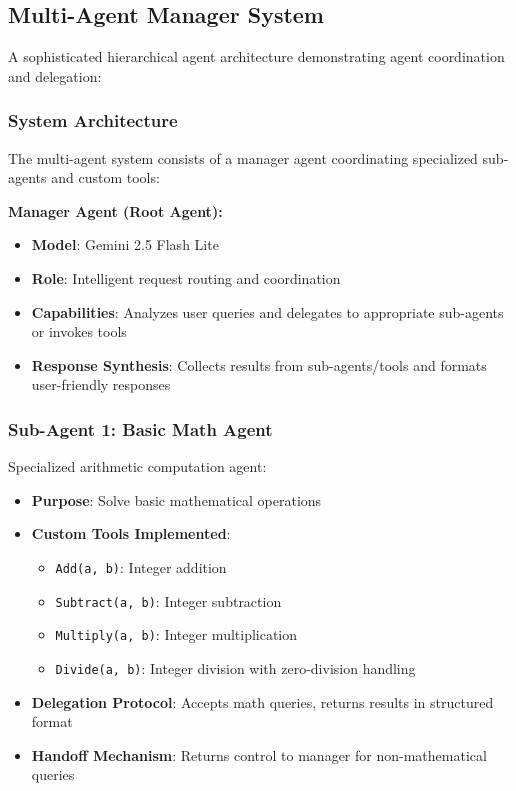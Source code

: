 \documentclass[12pt,a4paper]{article}
\begin{document}
\subsection{Multi-Agent Manager System}

A sophisticated hierarchical agent architecture demonstrating agent coordination and delegation:

\subsubsection{System Architecture}

The multi-agent system consists of a manager agent coordinating specialized sub-agents and custom tools:

\textbf{Manager Agent (Root Agent):}
\begin{itemize}
    \item \textbf{Model}: Gemini 2.5 Flash Lite
    \item \textbf{Role}: Intelligent request routing and coordination
    \item \textbf{Capabilities}: Analyzes user queries and delegates to appropriate sub-agents or invokes tools
    \item \textbf{Response Synthesis}: Collects results from sub-agents/tools and formats user-friendly responses
\end{itemize}

\subsubsection{Sub-Agent 1: Basic Math Agent}

Specialized arithmetic computation agent:
\begin{itemize}
    \item \textbf{Purpose}: Solve basic mathematical operations
    \item \textbf{Custom Tools Implemented}:
    \begin{itemize}
        \item \texttt{Add(a, b)}: Integer addition
        \item \texttt{Subtract(a, b)}: Integer subtraction
        \item \texttt{Multiply(a, b)}: Integer multiplication
        \item \texttt{Divide(a, b)}: Integer division with zero-division handling
    \end{itemize}
    \item \textbf{Delegation Protocol}: Accepts math queries, returns results in structured format
    \item \textbf{Handoff Mechanism}: Returns control to manager for non-mathematical queries
\end{itemize}
\end{document}
